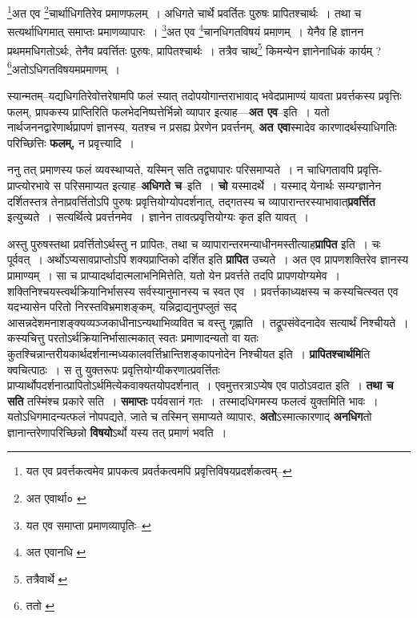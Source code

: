 \documentclass[article,12pt,a4paper]{memoir}
\begin{document}
	  \pstart \footnote{यत एव प्रवर्त्तकत्वमेव प्रापकत्व प्रवर्तकत्वमपि प्रवृत्तिविषयप्रदर्शकत्वम्--\cite{dp-msD-n}}\-अत एव \footnote{अत एवार्था० \cite{dp-msB}}\-चार्थाधिगतिरेव प्रमाणफलम् । अधिगते चार्थे प्रवर्तितः पुरुषः प्रापितश्चार्थः । तथा च सत्यर्थाधिगमात् समाप्तः प्रमाणव्यापारः । \footnote{यत एव समाप्ता प्रमाणव्यापृतिः--\cite{dp-msD-n}}\-अत एव \footnote{अत एवानधि \cite{dp-msA} \cite{dp-edP} \cite{dp-edH} \cite{dp-edE} \cite{dp-edN}}\-चानधिगतविषयं प्रमाणम् । येनैव हि ज्ञानन प्रथममधिगतोऽर्थः, तेनैव प्रवर्त्तितः पुरुषः, प्रापितश्चार्थः । तत्रैव चाथ\footnote{तत्रैवार्थे \cite{dp-msA} \cite{dp-edP} \cite{dp-edE} \cite{dp-edH} \cite{dp-edN}} किमन्येन ज्ञानेनाधिकं कार्यम् ? \footnote{ततो \cite{dp-msA} \cite{dp-msB} \cite{dp-msC} \cite{dp-msD} \cite{dp-edP} \cite{dp-edH} \cite{dp-edE} \cite{dp-edN}}\-अतोऽधिगतविषयमप्रमाणम् ।
	\pend
      
	  \endgroup
	

	  \pstart स्यान्मतम्--यद्यधिगतिरेवोत्तरेषामपि फलं स्यात् तदोपयोगान्तराभावाद् भवेदप्रामाण्यं यावता प्रवर्त्तकस्य प्रवृत्तिः फलम्, प्रापकस्य प्राप्तिरिति फलभेदनिष्पत्तेर्भिन्नो व्यापार इत्याह—\textbf{अत एव}--इति । यतो नार्थजननद्वारेणार्थप्रापणं ज्ञानस्य, यतश्च न प्रसह्य प्रेरणेन प्रवर्त्तनम्, \textbf{अत एवा}स्मादेव कारणादर्थस्याधिगतिः परिच्छित्तिः \textbf{फलम्,} न प्रवृत्त्यादि ।
	\pend
      

	  \pstart ननु तत् प्रमाणस्य फलं व्यवस्थाप्यते, यस्मिन् सति तद्व्यापारः परिसमाप्यते । न चाधिगतावपि प्रवृत्ति-प्राप्त्योरभावे स परिसमाप्यत इत्याह--\textbf{अधिगते च}--इति । \textbf{चो} यस्मादर्थे । यस्माद् येनार्थः सम्यग्ज्ञानेन दर्शितस्तत्र तेनाप्रवर्त्तितोऽपि पुरुषः प्रवृत्तियोग्योपदर्शनात्, तद्गतस्य च व्यापारान्तरस्याभावात्\textbf{प्रवर्त्तित} इत्युच्यते । सत्यर्थित्वे प्रवर्त्तनमेव । ज्ञानेन तावत्प्रवृत्तियोग्यः कृत इति यावत् ।
	\pend
      

	  \pstart अस्तु पुरुषस्तथा प्रवर्त्तितोऽर्थस्तु न प्रापितः, तथा च व्यापारान्तरमन्याधीनमस्तीत्याह\textbf{प्रापित} इति । चः पूर्ववत् । अर्थोऽप्यसावप्राप्तोऽपि शक्यप्राप्तिको दर्शित इति \textbf{प्रापित} उच्यते । अत एव प्रापणशक्तिरेव ज्ञानस्य प्रामाण्यम् । सा च प्राप्यादर्थादात्मलाभनिमित्तेति, यतो \leavevmode{} येन प्रवर्त्तते तदपि प्रापणयोग्यमेव । शक्तिनिश्चयस्त्वर्थक्रियानिर्भासस्य सर्वस्यानुमानस्य च स्वत एव । प्रवर्त्तकाध्यक्षस्य च कस्यचित्स्वत एव यदभ्यासेन परितो निरस्तविभ्रमाशङ्कम्, यन्निद्राद्यनुपप्लुतं सद् आसन्नदेशमनाशङ्क्यव्यञ्जकाधीनाऽन्यथाभिव्यवित च वस्तु गृह्णाति । तद्रूपसंवेदनादेव सत्यार्थं निश्चीयते । कस्यचित्तु परतोऽर्थक्रियानिर्भासात्मकात् स्वतः प्रमाणादन्यतो वा यतः कुतश्चिन्नान्तरीयकार्थदर्शनान्मध्यकालवर्त्तिभ्रान्तिशङ्कापनोदेन निश्चीयत इति । \textbf{प्रापितश्चार्थमि}ति क्वचित्पाठः । स तु युक्तरूपः प्रवृत्तियोग्यीकरणात्प्रवर्त्तितः प्राप्यार्थोपदर्शनात्प्रापितोऽर्थमित्येकवाक्यतयोपदर्शनात् । एवमुत्तरत्राऽप्येष एव पाठोऽवदात इति । \textbf{तथा च सति} तस्मिंश्च प्रकारे सति । \textbf{समाप्तः} पर्यवसानं गतः । तस्मादधिगमस्य फलत्वं युक्तमिति भावः । यतोऽधिगमादन्यत्फलं नोपपद्यते, जाते च तस्मिन् समाप्यते व्यापारः, \textbf{अतो}ऽस्मात्कारणाद् \textbf{अनधिग}तो ज्ञानान्तरेणापरिच्छिन्नो \textbf{विषयो}ऽर्थो यस्य तत् प्रमाणं भवति ।
	\pend
      
\end{document}
